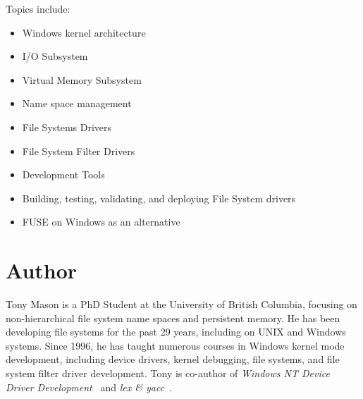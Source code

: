 \documentclass[letter,11pt]{article}
\begin{document}
\vspace{0.2cm}

Topics include:

\begin{itemize}

\item Windows kernel architecture
\item I/O Subsystem
\item Virtual Memory Subsystem
\item Name space management
\item File Systems Drivers
\item File System Filter Drivers
\item Development Tools
\item Building, testing, validating, and deploying File System drivers
\item FUSE on Windows as an alternative
\end{itemize}


\section*{Author}

Tony Mason is a PhD Student at the University of British Columbia, focusing on non-hierarchical file system name spaces and persistent memory.  He has been developing file systems for the past 29 years, including on UNIX and Windows systems.  Since 1996, he has taught numerous courses in Windows kernel mode development, including device drivers, kernel debugging, file systems, and file system filter driver development.  Tony is co-author of \textit{Windows NT Device Driver Development}~\cite{viscarola1998windows} and \textit{lex \& yacc}~\cite{levine1992lex}.

\printbibliography[title={Bibliography}]
\end{document}
